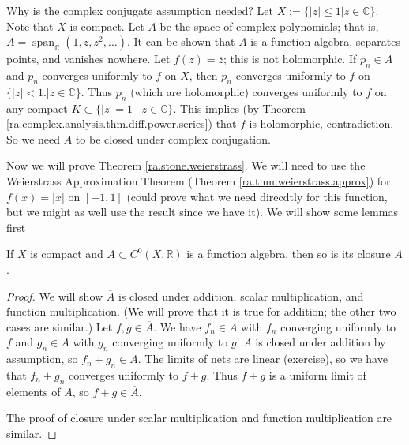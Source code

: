 \begin{remark}
Why is the complex conjugate assumption needed? Let \(X := \{ |z| \leq 1 | z \in \mathbb{C}\}\). Note that \(X\) is compact. Let \(A\) be the space of complex polynomials; that is, \(A = \operatorname{span}_{\mathbb{C}}(1, z, z^2, \ldots)\). It can be shown that \(A\) is a function algebra, separates points, and vanishes nowhere. Let \(f(z) = \overline{z}\); this is not holomorphic. If \(p_n \in A\) and \(p_n\) converges uniformly to \(f\) on \(X\), then \(p_n\) converges uniformly to \(f\) on \(\{|z | < 1. | z \in \mathbb{C}\}\). Thus \(p_n\) (which are holomorphic) converges uniformly to \(f\) on any compact \(K \subset \{|z| = 1 \mid z \in \mathbb{C}\}\). This implies (by Theorem \ref{ra.complex.analysis.thm.diff.power.series}) that \(f\) is holomorphic, contradiction. So we need \(A\) to be closed under complex conjugation.

\end{remark}

Now we will prove Theorem \ref{ra.stone.weierstrass}. We will need to use the Weierstrass Approximation Theorem (Theorem \ref{ra.thm.weierstrass.approx}) for \(f(x) = |x|\) on \([-1,1]\) (could prove what we need direcdtly for this function, but we might as well use the result since we have it). We will show some lemmas first

\begin{lemma}\label{ra.rudin.7.29.lem}

If \(X\) is compact and \(A \subset C^0(X, \mathbb{R})\) is a function algebra, then so is its closure \(\overline{A}\).

\end{lemma}

\begin{proof}

We will show \(\overline{A}\) is closed under addition, scalar multiplication, and function multiplication. (We will prove that it is true for addition; the other two cases are similar.) Let \(f, g \in \overline{A}\). We have \(f_n \in A\) with \(f_n \) converging uniformly to \(f\) and \(g_n \in A\) with \(g_n\) converging uniformly to \(g\). \(A\) is closed under addition by assumption, so \(f_n + g_n \in A\). The limits of nets are linear (exercise), so we have that \(f_n + g_n\) converges uniformly to \(f + g\). Thus \(f+ g\) is a uniform limit of elements of \(A\), so \(f+g \in \overline{A}\). 

The proof of closure under scalar multiplication and function multiplication are similar.

\end{proof}

